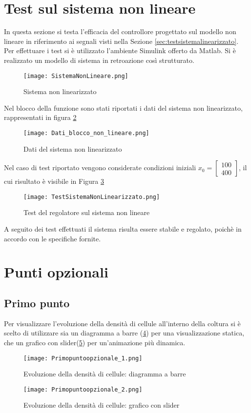 \documentclass[a4paper, 11pt]{article}
\begin{document}
\clearpage
\section{Test sul sistema non lineare}

In questa sezione si testa l'efficacia del controllore progettato sul modello non lineare in riferimento ai segnali visti nella Sezione \ref{sec:testsistemalinearizzato}.
\\
Per effettuare i test si è utilizzato l'ambiente Simulink offerto da Matlab.
Si è realizzato un modello di sistema in retroazione così strutturato.
\begin{figure}[H]
	\centering
	\texttt{[image: SistemaNonLineare.png]}
	\caption[]{Sistema non linearizzato}
	\label{Figura 11}
\end{figure}

Nel blocco della funzione sono stati riportati i dati del sistema non linearizzato, rappresentati in figura \ref{datibloccononlineare}
\begin{figure}[h!]
	\centering
	\texttt{[image: Dati\_blocco\_non\_lineare.png]}
	\caption[]{Dati del sistema non linearizzato}
	\label{datibloccononlineare}
\end{figure}

Nel caso di test riportato vengono considerate condizioni iniziali $x_0=\begin{bmatrix}
	100
	\\
	400
\end{bmatrix}$, il cui risultato è visibile in Figura \ref{Figura 13}
\begin{figure}[H]
	\centering
	\texttt{[image: TestSistemaNonLinearizzato.png]}
	\caption[]{Test del regolatore sul sistema non lineare}
	\label{Figura 13}
\end{figure}

A seguito dei test effettuati il sistema risulta essere stabile e regolato, poichè in accordo con le specifiche fornite.

\clearpage
\section{Punti opzionali}
\subsection{Primo punto}
Per visualizzare l'evoluzione della densità di cellule all'interno della coltura si è scelto di utilizzare sia un diagramma a barre (\ref{Figura 14}) per una visualizzazione statica, che un grafico con slider(\ref{Figura 15}) per un'animazione più dinamica.
\begin{figure}[H]
	\centering
	\texttt{[image: Primopuntoopzionale\_1.png]}
	\caption[]{Evoluzione della densità di cellule: diagramma a barre}
	\label{Figura 14}
\end{figure}
\begin{figure}[H]
	\centering
	\texttt{[image: Primopuntoopzionale\_2.png]}
	\caption[]{Evoluzione della densità di cellule: grafico con slider}
	\label{Figura 15}
\end{figure}
\end{document}

